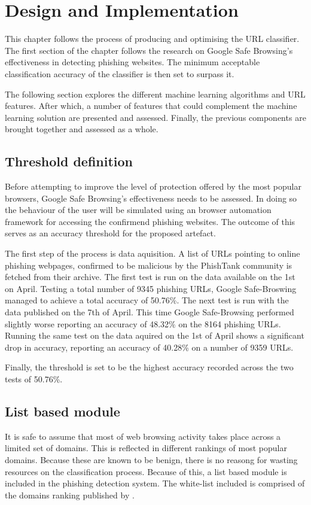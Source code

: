 
\chapter{Design and Implementation}
This chapter follows the process of producing and optimising the URL classifier. The first section of the chapter follows the research on Google Safe Browsing's effectiveness in detecting phishing websites. The minimum acceptable classification accuracy of the classifier is then set to surpass it.

The following section explores the different machine learning algorithms and URL features. After which, a number of features that could complement the machine learning solution are presented and assessed. Finally, the previous components are brought together and assessed as a whole.

\section{Threshold definition}
Before attempting to improve the level of protection offered by the most popular browsers, Google Safe Browsing's effectiveness needs to be assessed. In doing so the behaviour of the user will be simulated using an browser automation framework for accessing the confirmend phishing websites. The outcome of this serves as an accuracy threshold for the proposed artefact.

The first step of the process is data aquisition. A list of URLs pointing to online phishing webpages, confirmed to be malicious by the PhishTank community is fetched from their archive. The first test is run on the data available on the 1st on April. Testing a total number of 9345 phishing URLs, Google Safe-Broswing managed to achieve a total accuracy of 50.76\%.
The next test is run with the data published on the 7th of April. This time Google Safe-Browsing performed slightly worse reporting an accuracy of 48.32\% on the 8164 phishing URLs. Running the same test on the data aquired on the 1st of April shows a significant drop in accuracy, reporting an accuracy of 40.28\% on a number of 9359 URLs.

Finally, the threshold is set to be the highest accuracy recorded across the two tests of 50.76\%.

\section{List based module}
It is safe to assume that most of web browsing activity takes place across a limited set of domains. This is reflected in different rankings of most popular domains. Because these are known to be benign, there is no reasong for wasting resources on the classification process. Because of this, a list based module is included in the phishing detection system.
The white-list included is comprised of the domains ranking published by \cite{MAJESTIC_MILLION}.

